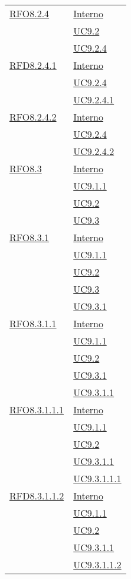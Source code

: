 \begin{longtable}{|>{\centering}m{5cm}|m{5cm}<{\centering}|}
\hyperlink{RFO8.2.4}{RFO8.2.4} & \hyperlink{Interno}{Interno}\\
& \hyperref[UC9.2]{UC9.2}\\
& \hyperref[UC9.2.4]{UC9.2.4}\\ \hline

\hyperlink{RFD8.2.4.1}{RFD8.2.4.1} & \hyperlink{Interno}{Interno}\\
& \hyperref[UC9.2.4]{UC9.2.4}\\
& \hyperref[UC9.2.4.1]{UC9.2.4.1}\\ \hline

\hyperlink{RFO8.2.4.2}{RFO8.2.4.2} & \hyperlink{Interno}{Interno}\\
& \hyperref[UC9.2.4]{UC9.2.4}\\
& \hyperref[UC9.2.4.2]{UC9.2.4.2}\\ \hline

\hyperlink{RFO8.3}{RFO8.3} & \hyperlink{Interno}{Interno}\\
& \hyperref[UC9.1.1]{UC9.1.1}\\
& \hyperref[UC9.2]{UC9.2}\\
& \hyperref[UC9.3]{UC9.3}\\ \hline

\hyperlink{RFO8.3.1}{RFO8.3.1} & \hyperlink{Interno}{Interno}\\
& \hyperref[UC9.1.1]{UC9.1.1}\\
& \hyperref[UC9.2]{UC9.2}\\
& \hyperref[UC9.3]{UC9.3}\\
& \hyperref[UC9.3.1]{UC9.3.1}\\ \hline

\hyperlink{RFO8.3.1.1}{RFO8.3.1.1} & \hyperlink{Interno}{Interno}\\
& \hyperref[UC9.1.1]{UC9.1.1}\\
& \hyperref[UC9.2]{UC9.2}\\
& \hyperref[UC9.3.1]{UC9.3.1}\\
& \hyperref[UC9.3.1.1]{UC9.3.1.1}\\ \hline

\hyperlink{RFO8.3.1.1.1}{RFO8.3.1.1.1} & \hyperlink{Interno}{Interno}\\
& \hyperref[UC9.1.1]{UC9.1.1}\\
& \hyperref[UC9.2]{UC9.2}\\
& \hyperref[UC9.3.1.1]{UC9.3.1.1}\\
& \hyperref[UC9.3.1.1.1]{UC9.3.1.1.1}\\ \hline

\hyperlink{RFD8.3.1.1.2}{RFD8.3.1.1.2} & \hyperlink{Interno}{Interno}\\
& \hyperref[UC9.1.1]{UC9.1.1}\\
& \hyperref[UC9.2]{UC9.2}\\
& \hyperref[UC9.3.1.1]{UC9.3.1.1}\\
& \hyperref[UC9.3.1.1.2]{UC9.3.1.1.2}\\ \hline


\end{longtable}
